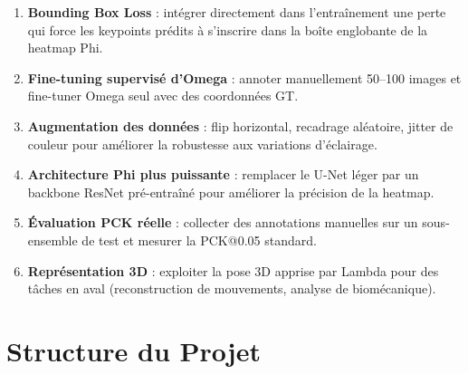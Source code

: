 \documentclass[12pt,a4paper]{article}
\begin{document}
\begin{enumerate}
  \item \textbf{Bounding Box Loss} : intégrer directement dans l'entraînement
        une perte qui force les keypoints prédits à s'inscrire dans la boîte
        englobante de la heatmap Phi.
  \item \textbf{Fine-tuning supervisé d'Omega} : annoter manuellement
        50--100 images et fine-tuner Omega seul avec des coordonnées GT.
  \item \textbf{Augmentation des données} : flip horizontal, recadrage aléatoire,
        jitter de couleur pour améliorer la robustesse aux variations d'éclairage.
  \item \textbf{Architecture Phi plus puissante} : remplacer le U-Net léger par un
        backbone ResNet pré-entraîné pour améliorer la précision de la heatmap.
  \item \textbf{Évaluation PCK réelle} : collecter des annotations manuelles sur
        un sous-ensemble de test et mesurer la PCK@0.05 standard.
  \item \textbf{Représentation 3D} : exploiter la pose 3D apprise par Lambda pour
        des tâches en aval (reconstruction de mouvements, analyse de biomécanique).
\end{enumerate}

\section{Structure du Projet}
\end{document}
